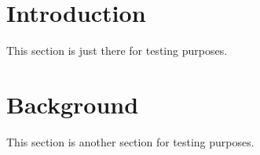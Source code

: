 \documentclass{amsart}
\begin{document}
\section{Introduction}

This section is just there for testing purposes.

\section{Background}

This section is another section for testing purposes.

\end{document}
